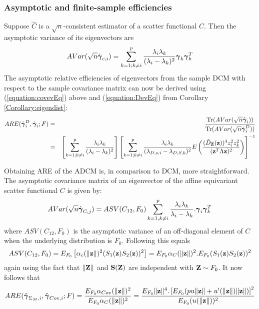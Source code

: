 \documentclass[fleqn,11pt]{article}
\DeclareMathOperator*{\Tr}{Tr}
\begin{document}
\subsubsection{Asymptotic and finite-sample efficiencies}

Suppose $\hat C$ is a $\sqrt n$-consistent estimator of a scatter functional $C$. Then the asymptotic variance of its eigenvectors are \cite{anderson}
%
\begin{equation} \label{equation:covevEq}
AVar(\sqrt n\hat {{\boldsymbol{\gamma}}}_{c,i}) = \sum_{k=1; k \neq i}^p \frac{\lambda_i \lambda_k}{(\lambda_i - \lambda_k)^2} {\boldsymbol{\gamma}}_k {\boldsymbol{\gamma}}_k^T
\end{equation}
%
The asymptotic relative efficiencies of eigenvectors from the sample DCM with respect to the sample covariance matrix can now be derived using (\ref{equation:covevEq}) above and (\ref{equation:DevEq}) from Corollary \ref{Corollary:eigendist}:
%
\begin{eqnarray*}
ARE(\hat\bfgamma^D_i, \hat\bfgamma_i; F) &=& \frac{\Tr( AVar(\sqrt n\hat \bfgamma_i))}{\Tr( AVar(\sqrt n\hat \bfgamma^D_i))}\\
&=& \left[\sum_{k=1; k \neq i}^p \frac{\lambda_i \lambda_k}{(\lambda_i - \lambda_k)^2} \right] \left[ \sum_{k=1; k \neq i}^p \frac{\lambda_i \lambda_k }{(\lambda_{D,s,i} - \lambda_{D,S,k})^2} E \left( \frac{(\tilde D_\bfZ (\bfz))^4 z_i^2 z_k^2}{(\bfz^T \Lambda \bfz)^2} \right) \right]^{-1}
\end{eqnarray*}

Obtaining ARE of the ADCM is, in comparison to DCM, more straightforward. The asymptotic covariance matrix of an eigenvector of the affine equivariant scatter functional $C$ is given by:
%
$$
AVar (\sqrt n  \hat{{\boldsymbol{\gamma}}}_{C,j}) = ASV (C_{12}, F_0) \sum_{k=1, k \neq i}^p \frac{\lambda_i \lambda_k}{\lambda_i - \lambda_k}. {\boldsymbol{\gamma}}_i {\boldsymbol{\gamma}}_k^T
$$
%
where $ASV (C_{12}, F_0)$ is the asymptotic variance of an off-diagonal element of $C$ when the underlying distribution is $F_0$. Following \cite{croux00} this equals
%
$$
ASV (C_{12}, F_0) = E_{F_0} \left[ \alpha_c (\| {\bf{z}} \|)^2 (S_1({\bf{z}})S_2 ({\bf{z}}))^2 \right] = E_{F_0} \alpha_C (\| {\bf{z}} \|)^2 . E_{F_0} (S_1({\bf{z}})S_2 ({\bf{z}}))^2 
$$
% 
again using the fact that $\|{\mathbf{Z}}\|$ and ${\mathbf{S}}({\mathbf{Z}})$ are independent with ${\mathbf{Z}} \sim F_0$. It now follows that
%
\begin{equation}
ARE (\hat{{\boldsymbol{\gamma}}}_{\Sigma_M,i}, \hat{{\boldsymbol{\gamma}}}_{Cov,i}; F) = \frac{E_{F_0} \alpha_{Cov} (\| {\bf{z}} \|)^2}{E_{F_0} \alpha_C (\| {\bf{z}} \|)^2} = \frac{E_{F_0} \| {\bf{z}} \|^4. \left[ E_{F_0} ( p u \| {\bf{z}}\| + u'( \| {\bf{z}} \|) \| {\bf{z}} \| ) \right]^2}{E_{F_0} (u(\| {\bf{z}} \|))^2}
\end{equation}
%
\end{document}
